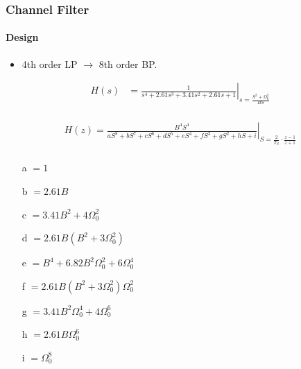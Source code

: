 \begin{frame} \frametitle{Channel Filter}
    \framesubtitle{Design}
%
%    
    \begin{itemize}
        \item 4th order LP $\rightarrow$ 8th order BP.
    \end{itemize}
\begin{equation*}
    \begin{aligned}
        H(s) &= \left.\frac{1}{s^4 + 2.61s^3 + 3.41s^2 + 2.61s + 1} \right|_{s = \frac{S^2 + \Omega_0^2}{B S}}\\
    \end{aligned}
\end{equation*}


%
%    
\begin{equation*}
    \begin{aligned}
    \left. H(z) = \frac{B^4 S^4 }{a S^8 + b S^7 + c S^6 + d S^5 + e S^4 + f S^3 + g S^2 + h S + i}\right|_{S  = \frac{2}{T_S}\cdot\frac{z-1}{z+1}}\\
\label{eq:bilinear_done}
\end{aligned}
\end{equation*}
    \begin{itemize}
    \item[a] $= 1$
    \item[b] $= 2.61B$
    \item[c] $= 3.41B^2 + 4\Omega_\text{0}^2$
    \item[d] $= 2.61B(B^2 + 3\Omega_\text{0}^2)$
    \item[e] $= B^4 + 6.82B^2 \Omega_\text{0}^2 + 6\Omega_\text{0}^4$
    \item[f] $= 2.61B(B^2 + 3\Omega_\text{0}^2)\Omega_\text{0}^2$     
    \item[g] $= 3.41 B^2 \Omega_\text{0}^4 + 4\Omega_\text{0}^6$ 
    \item[h] $= 2.61 B \Omega_\text{0}^6$
    \item[i] $= \Omega_\text{0}^8$
    \end{itemize}
\end{frame}



